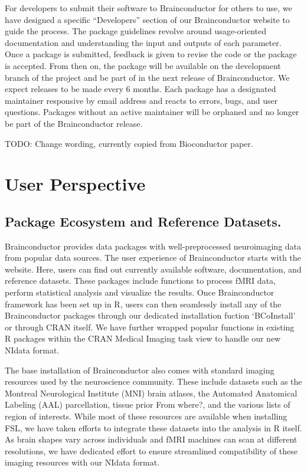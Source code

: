 \documentclass{nature}
\begin{document}
For developers to submit their software to Brainconductor for others to use,
we have designed a specific ``Developers'' section of our Brainconductor website
to guide the process. The package guidelines revolve around usage-oriented
documentation and understanding the input and outputs of each parameter.
 Once
a package is submitted, feedback is given to revise the code or the package is
accepted.
From then on, the package will be available on the
development branch of the project and be part of in the next release of
Brainconductor.
We expect releases to be made every 6 months.
Each package has a designated maintainer responsive by email address and reacts
to
errors, bugs, and user questions. Packages without an active maintainer will be
orphaned and no longer be part of the Brainconductor release.

{\color{red}TODO: Change wording, currently copied from Bioconductor paper.}



\section{User Perspective}


\subsection{Package Ecosystem and Reference Datasets.}
Brainconductor provides data packages with well-preprocessed neuroimaging data
from popular data sources.
The user experience of Brainconductor starts with the website. Here, users can
find out currently available software, documentation, and reference datasets.
These packages include functions to process fMRI data, perform statistical
analysis and visualize the results.
Once Brainconductor framework has been set up in R, users can then
seamlessly install any of the Brainconductor packages through our
dedicated installation fuction `BCoInstall' or through CRAN itself.
We have further wrapped popular functions in existing R packages
within the CRAN Medical Imaging task view to handle our new NIdata format.


The base installation of Brainconductor also comes with standard imaging
resources
used by the neuroscience community. These include datasets such
as the Montreal Neurological
Institute (MNI) brain atlases, the Automated Anatomical Labeling (AAL)
parcellation\cite{tzourio2002automated},
tissue prior {\color{red}From where?},
and the various lists of region of interests. While most of these
resources are available when installing FSL, we have taken
efforts to integrate these datasets into the analysis in R itself.
As brain shapes vary across individuals
and fMRI machines can scan at different resolutions, we have
dedicated effort
to ensure streamlined compatibility of these imaging resources with our NIdata
format.
\end{document}
